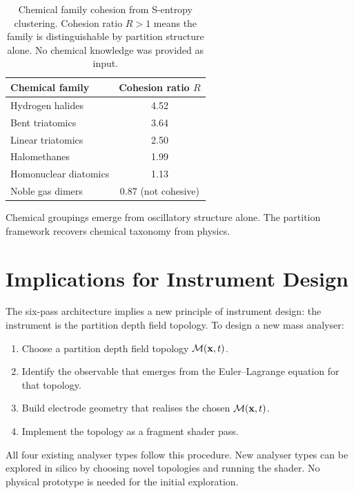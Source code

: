 \begin{table}[htbp]
\centering
\caption{Chemical family cohesion from S-entropy clustering.  Cohesion ratio
  $R > 1$ means the family is distinguishable by partition structure alone.
  No chemical knowledge was provided as input.}
\label{tab:ch22-cohesion}
\begin{tabular}{@{}lc@{}}
\toprule
\textbf{Chemical family} & \textbf{Cohesion ratio $R$} \\
\midrule
Hydrogen halides          & 4.52 \\
Bent triatomics           & 3.64 \\
Linear triatomics         & 2.50 \\
Halomethanes              & 1.99 \\
Homonuclear diatomics     & 1.13 \\
Noble gas dimers          & 0.87 (not cohesive) \\
\bottomrule
\end{tabular}
\end{table}

Chemical groupings emerge from oscillatory structure alone.  The partition
framework recovers chemical taxonomy from physics.

\section{Implications for Instrument Design}
\label{sec:ch22-implications}

The six-pass architecture implies a new principle of instrument design: the
instrument is the partition depth field topology.  To design a new mass analyser:

\begin{enumerate}
  \item Choose a partition depth field topology $\mathcal{M}(\mathbf{x},t)$.
  \item Identify the observable that emerges from the Euler--Lagrange equation
    for that topology.
  \item Build electrode geometry that realises the chosen $\mathcal{M}(\mathbf{x},t)$.
  \item Implement the topology as a fragment shader pass.
\end{enumerate}

All four existing analyser types follow this procedure.  New analyser types
can be explored in silico by choosing novel topologies and running the shader.
No physical prototype is needed for the initial exploration.

